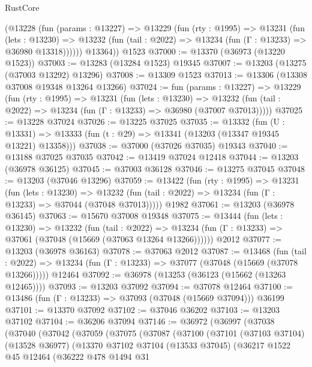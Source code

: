 \begin{lexlean}{RustCore}
\begin{coremodule}
        (@13228
          (fun (params : @13227) =>
          @13229
            (fun (rty : @1995) =>
            @13231
              (fun (lets : @13230) =>
              @13232 (fun (tail : @2022) => @13234 (fun (Γ : @13233) => @36980 @13318))))))
        @13364))
    @1523
@37000 := @13370 (@36973 (@13220 @1523))
@37003 := @13283 (@13284 @1523) @19345
@37007 := @13203 (@13275 (@37003 @13292) @13296)
@37008 := @13309 @1523
@37013 := @13306 (@13308 @37008 @19348 @13264 @13266)
@37024 := fun (params : @13227) =>
  @13229
    (fun (rty : @1995) =>
    @13231
      (fun (lets : @13230) =>
      @13232 (fun (tail : @2022) => @13234 (fun (Γ : @13233) => @36980 (@37007 @37013)))))
@37025 := @13228 @37024
@37026 := @13225 @37025
@37035 := @13332
    (fun (U : @13331) => @13333 (fun (t : @29) => @13341 (@13203 (@13347 @19345 @13221) @13358)))
@37038 := @37000 (@37026 @37035) @19343
@37040 := @13188 @37025 @37035
@37042 := @13419 @37024 @12418
@37044 := @13203 (@36978 @36125)
@37045 := @37003 @36128
@37046 := @13275 @37045
@37048 := @13203 (@37046 @13296)
@37059 := @13422
    (fun (rty : @1995) =>
    @13231
      (fun (lets : @13230) =>
      @13232 (fun (tail : @2022) => @13234 (fun (Γ : @13233) => @37044 (@37048 @37013)))))
    @1982
@37061 := @13203 (@36978 @36145)
@37063 := @15670 @37008 @19348
@37075 := @13444
    (fun (lets : @13230) =>
    @13232
      (fun (tail : @2022) =>
      @13234 (fun (Γ : @13233) => @37061 (@37048 (@15669 (@37063 @13264 @13266))))))
    @2012
@37077 := @13203 (@36978 @36163)
@37078 := @37063 @2012
@37087 := @13468
    (fun (tail : @2022) => @13234 (fun (Γ : @13233) => @37077 (@37048 (@15669 (@37078 @13266)))))
    @12464
@37092 := @36978 (@13253 (@36123 (@15662 (@13263 @12465))))
@37093 := @13203 @37092
@37094 := @37078 @12464
@37100 := @13486 (fun (Γ : @13233) => @37093 (@37048 (@15669 @37094))) @36199
@37101 := @13370 @37092
@37102 := @37046 @36202
@37103 := @13203 @37102
@37104 := @36206 @37094
@37146 := @36972
    (@36997
      (@37038
        (@37040
          (@37042
            (@37059
              (@37075
                (@37087
                  (@37100
                    (@37101
                      (@37103 @37104)
                      (@13528 @36977)
                      (@13370
                        @37102
                        @37104
                        (@13533 @37045)
                        (@36217
                          @1522
                          @45
                          @12464
                          (@36222
                            @478
                            @1494
                            @31

\end{coremodule}
\end{lexlean}
